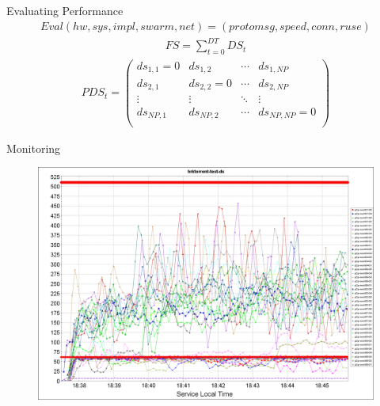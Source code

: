 \documentclass{beamer}
\begin{document}
\begin{frame}{Evaluating Performance}
  \footnotesize
  \begin{align}
    Eval(hw, sys, impl, swarm, net) = (protomsg, speed, conn, ruse)
  \end{align}
  \begin{align}
    FS = \sum_{t=0}^{DT} DS_{t}
  \end{align}
  \begin{align}
    PDS_{t} =
    \begin{pmatrix}
      ds_{1,1} = 0 & ds_{1,2} & \cdots & ds_{1,NP} \\
      ds_{2,1} & ds_{2,2} = 0 & \cdots & ds_{2,NP} \\
      \vdots & \vdots & \ddots & \vdots \\
      ds_{NP,1} & ds_{NP,2} & \cdots & ds_{NP,NP} = 0 \\
    \end{pmatrix}
  \end{align}
\end{frame}

\begin{frame}{Monitoring}
  \begin{figure}
    \includegraphics[scale=0.15]{img/test-monalisa-virt-env-start}
  \end{figure}
\end{frame}
\end{document}
